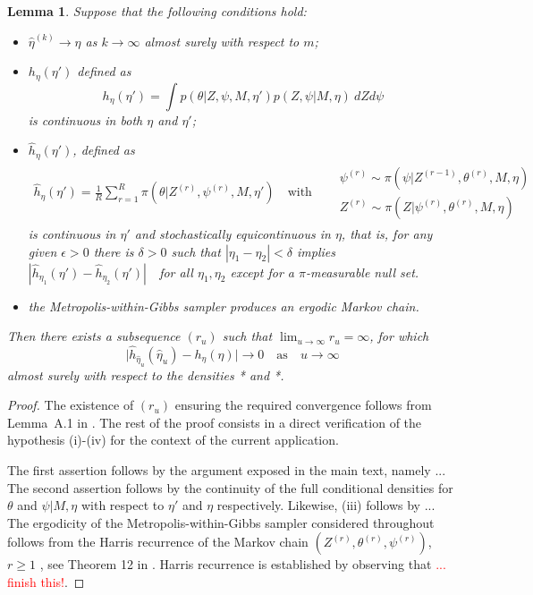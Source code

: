 \documentclass[11pt]{amsart}
\newtheorem{lemma}{Lemma}
\theoremstyle{definition}
\theoremstyle{remark}
\begin{document}
\begin{lemma}\label{lem:technical} Suppose that the following
  conditions hold:
\begin{itemize}
 \item[(i)] $\hat\eta^{(k)} \to \eta$ as $k \to \infty$ almost
   surely with respect to $m$; 
 \item[(ii)] $h_\eta(\eta')$ defined as
\[
  h_{\eta}(\eta') 
   = 
 \int p(\theta|Z, \psi, M, \eta')p(Z, \psi|M, \eta)\ dZd\psi
\]
is continuous in both $\eta$ and $\eta'$;
\item[(iii)] $\widehat h_\eta(\eta')$, defined as
\begin{align*}
  \widehat h_\eta(\eta') 
  = 
 \frac{1}{R}\sum_{r=1}^R \pi(\theta|Z^{(r)}, \psi^{(r)}, M, \eta')
    \quad \text{with}\quad 
   \begin{aligned}
      &\psi^{(r)} \sim \pi(\psi|Z^{(r-1)}, \theta^{(r)}, M, \eta)\\
      &Z^{(r)} \sim \pi(Z| \psi^{(r)}, \theta^{(r)}, M, \eta) 
   \end{aligned}
\end{align*}
 is continuous in $\eta'$ and stochastically equicontinuous in $\eta$,
that is, for any given $\epsilon > 0$ there is $\delta>0$ such that
$|\eta_1 - \eta_2| < \delta$ implies $|\widehat h_{\eta_1}(\eta') -
\widehat h_{\eta_2}(\eta')|$\ \ for all $\eta_1, \eta_2$ except for a
$\pi$-measurable null set.
 \item[(iv)] the Metropolis-within-Gibbs sampler produces an ergodic Markov chain.
\end{itemize}
Then there exists a subsequence $(r_u)$ such that $\lim_{u\to\infty}
r_u  = \infty$, for which
\[
   \big|\widehat h_{\hat\eta_u}(\hat\eta_u) - h_\eta(\eta)\big| \to 0 
  \quad\text{as}\quad 
   u \to \infty
\]
almost surely with respect to the densities * and *.
\end{lemma}
\begin{proof} The existence of $(r_u)$ ensuring the required
convergence follows from Lemma~A.1 in \cite{C01}.  The rest of the
proof consists in a direct verification of the hypothesis (i)-(iv) for
the context of the current application.


The first assertion follows by the argument exposed in the main text, 
namely ... The second assertion follows by the continuity of the full
conditional densities for $\theta$ and $\psi|M, \eta$ with respect to
$\eta'$ and $\eta$ respectively. Likewise, (iii) follows by ... The
ergodicity of the Metropolis-within-Gibbs sampler considered
throughout follows from the Harris recurrence of the Markov chain
$(Z^{(r)}, \theta^{(r)}, \psi^{(r)})$, $r \geqslant 1$ , see Theorem
12 in \cite{RR}. Harris recurrence is established by observing that
\textcolor{red}{... finish this!}.
\end{proof}
\end{document}
